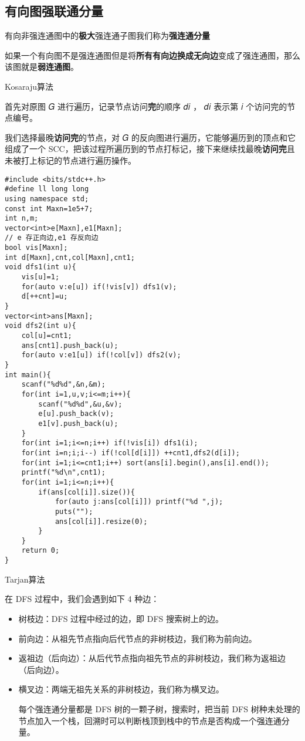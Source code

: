 \documentclass[]{article}
\begin{document}
\hypertarget{ux6709ux5411ux56feux5f3aux8054ux901aux5206ux91cf}{%
\subsection{有向图强联通分量}\label{ux6709ux5411ux56feux5f3aux8054ux901aux5206ux91cf}}

有向非强连通图中的\textbf{极大}强连通子图我们称为\textbf{强连通分量}

如果一个有向图不是强连通图但是将\textbf{所有有向边换成无向边}变成了强连通图，那么该图就是\textbf{弱连通图}。

Kosaraju算法

首先对原图 𝐺 进行遍历，记录节点访问\textbf{完}的顺序 𝑑𝑖 ， 𝑑𝑖 表示第 𝑖
个访问完的节点编号。

我们选择最晚\textbf{访问完}的节点，对 𝐺
的反向图进行遍历，它能够遍历到的顶点和它组成了一个
SCC，把该过程所遍历到的节点打标记，接下来继续找最晚\textbf{访问完}且未被打上标记的节点进行遍历操作。

\begin{verbatim}
#include <bits/stdc++.h>
#define ll long long
using namespace std;
const int Maxn=1e5+7;
int n,m;
vector<int>e[Maxn],e1[Maxn];
// e 存正向边,e1 存反向边 
bool vis[Maxn];
int d[Maxn],cnt,col[Maxn],cnt1;
void dfs1(int u){
    vis[u]=1;
    for(auto v:e[u]) if(!vis[v]) dfs1(v);
    d[++cnt]=u;
}
vector<int>ans[Maxn];
void dfs2(int u){
    col[u]=cnt1;
    ans[cnt1].push_back(u);
    for(auto v:e1[u]) if(!col[v]) dfs2(v);
}
int main(){
    scanf("%d%d",&n,&m);
    for(int i=1,u,v;i<=m;i++){
        scanf("%d%d",&u,&v);
        e[u].push_back(v);
        e1[v].push_back(u);
    }
    for(int i=1;i<=n;i++) if(!vis[i]) dfs1(i);
    for(int i=n;i;i--) if(!col[d[i]]) ++cnt1,dfs2(d[i]);
    for(int i=1;i<=cnt1;i++) sort(ans[i].begin(),ans[i].end());
    printf("%d\n",cnt1);
    for(int i=1;i<=n;i++){
        if(ans[col[i]].size()){
            for(auto j:ans[col[i]]) printf("%d ",j);
            puts("");
            ans[col[i]].resize(0);
        }
    }
    return 0;
}
\end{verbatim}

Tarjan算法

在 DFS 过程中，我们会遇到如下 4 种边：

\begin{itemize}
\item
  树枝边：DFS 过程中经过的边，即 DFS 搜索树上的边。
\item
  前向边：从祖先节点指向后代节点的非树枝边，我们称为前向边。
\item
  返祖边（后向边）：从后代节点指向祖先节点的非树枝边，我们称为返祖边（后向边）。
\item
  横叉边：两端无祖先关系的非树枝边，我们称为横叉边。

  每个强连通分量都是 DFS 树的一颗子树，搜索时，把当前 DFS
  树种未处理的节点加入一个栈，回溯时可以判断栈顶到栈中的节点是否构成一个强连通分量。
\end{itemize}
\end{document}
